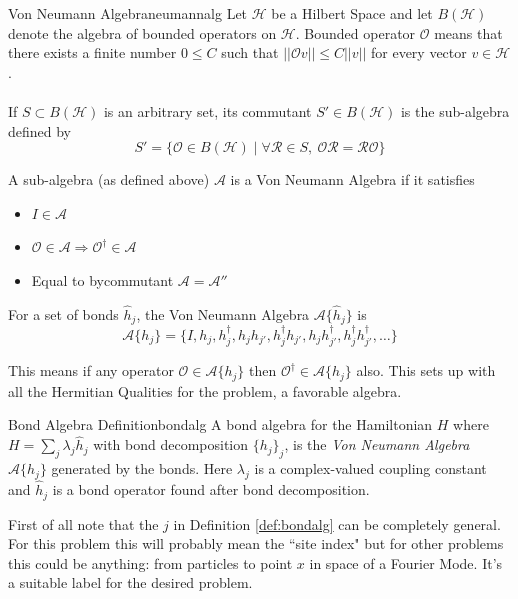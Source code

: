 \documentclass[12pt]{article}        %
\def\implies{\Rightarrow}
\begin{document}
\begin{definition}
	{Von Neumann Algebra}{neumannalg}
Let $\mathcal H$ be a Hilbert Space and let $B(\mathcal H)$ denote the algebra of bounded operators on $\mathcal H$. Bounded operator $\mathcal O$ means that there exists a finite number $0\le C$ such that $| | \mathcal O v  | | \le C | | v | | $ for every vector $v \in \mathcal H$. 
\\
\
\\
If $S \subset B(\mathcal H)$ is an arbitrary set, its commutant $S' \in B(\mathcal H)$ is the sub-algebra defined by 
\[
S' = \{\mathcal O \in B(\mathcal H)  \mid \forall \mathcal R \in S, \ \mathcal O \mathcal R = \mathcal R \mathcal O \} 
\] 

A sub-algebra (as defined above) $\mathcal A$ is a Von Neumann Algebra if it satisfies
\begin{itemize}
	\item $I \in \mathcal A$
	\item $\mathcal O \in \mathcal A \implies \mathcal O ^{\dagger} \in \mathcal A$ 
	\item Equal to bycommutant $\mathcal A = \mathcal A '' $
\end{itemize}

For a set of bonds $\hat{h}_j$, the Von Neumann Algebra $\mathcal A \{\hat{h}_j\} $ is
	\[
		\mathcal A \{h_j\} = \{\hat{I} , h_j, h_j ^{\dagger}, h_j h_{j'}, h_j^\dagger h_{j'}, h_j h_{j'}^\dagger, h ^{\dagger}_j h ^{\dagger}_{j'}, \ldots\} 
	\] 
\end{definition}
This means if any operator $\mathcal O \in \mathcal A \{h_j\} $ then $\mathcal O ^{\dagger} \in \mathcal A \{h_j\} $ also. This sets up with all the Hermitian Qualities for the problem, a favorable algebra.  
\begin{definition}{Bond Algebra Definition}{bondalg}
	A bond algebra for the Hamiltonian $H$ where $H = \sum _j \lambda_j \hat{h}_j$ with bond decomposition $\{h_j\} _j $, is the \emph{Von Neumann Algebra} $\mathcal A \{h_j\} $ generated by the bonds. Here $\lambda_j$ is a complex-valued coupling constant and $\hat{h} _j$ is a bond operator found after bond decomposition. 
\end{definition}
First of all note that the $j$ in Definition \ref{def:bondalg} can be completely general. For this problem this will probably mean the ``site index" but for other problems this could be anything: from particles to point $x$ in space of a Fourier Mode. It's a suitable label for the desired problem.
\end{document}

